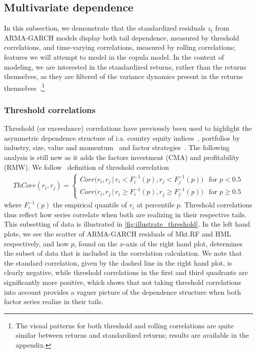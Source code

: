 
\subsection{Multivariate dependence} %

In this subsection, we demonstrate that the standardized residuals ${z_t}$ from ARMA-GARCH models display both tail dependence, measured by threshold correlations, and time-varying correlations, measured by rolling correlations; features we will attempt to model in the copula model. In the context of modeling, we are interested in the standardized returns, rather than the returns themselves, as they are filtered of the variance dynamics present in the returns themselves~\autocite{ChristoffersenLanglois2013}.\footnote{The visual patterns for both threshold and rolling correlations are quite similar between returns and standardized returns; results are available in the appendix.}

\subsubsection{Threshold correlations}

Threshold (or exceedance) correlations have previously been used to highlight the asymmetric dependence structure of i.a. country equity indices~\autocite{LonginSolnik2001}, portfolios by industry, size, value and momentum~\autocite{AngChen2002} and factor strategies~\autocite{ChristoffersenLanglois2013}. The following analysis is still new as it adds the factors investment (CMA) and profitability (RMW). We follow~\textcite{ChristoffersenLanglois2013} definition of threshold correlation
\begin{align}
    ThCorr(r_i, r_j) = 
    \begin{cases} 
        Corr\Big(r_i, r_j \,|\, r_i < F_i^{-1}(p), r_j < F_j^{-1}(p)\Big)  & \text{for } p < 0.5 \\
        Corr\Big(r_i, r_j \,|\, r_i \geq F_i^{-1}(p), r_j \geq F_j^{-1}(p)\Big)  & \text{for } p \geq 0.5
    \end{cases}
\end{align}
where $F_i^{-1}(p)$ the empirical quantile of $r_i$ at percentile $p$. Threshold correlations thus reflect how series correlate when both are realizing in their respective tails. This subsetting of data is illustrated in \autoref{fig:illustrate_threshold}. In the left hand plots, we see the scatter of ARMA-GARCH residuals of Mkt.RF and HML respectively, and how $p$, found on the $x$-axis of the right hand plot, determines the subset of data that is included in the correlation calculation. We note that the standard correlation, given by the dashed line in the right hand plot, is clearly negative, while threshold correlations in the first and third quadrants are significantly more positive, which shows that not taking threshold correlations into account provides a vaguer picture of the dependence structure when both factor series realize in their tails.

